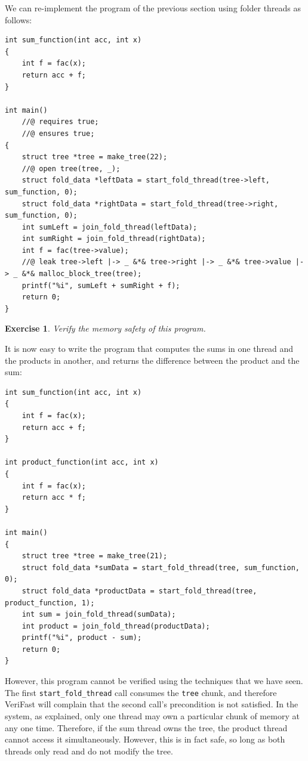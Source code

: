 \documentclass{article}
\newtheorem{exercise}{Exercise}
\begin{document}
We can re-implement the program of the previous section using folder threads as follows:
\begin{lstlisting}
int sum_function(int acc, int x)
{
    int f = fac(x);
    return acc + f;
}

int main()
    //@ requires true;
    //@ ensures true;
{
    struct tree *tree = make_tree(22);
    //@ open tree(tree, _);
    struct fold_data *leftData = start_fold_thread(tree->left, sum_function, 0);
    struct fold_data *rightData = start_fold_thread(tree->right, sum_function, 0);
    int sumLeft = join_fold_thread(leftData);
    int sumRight = join_fold_thread(rightData);
    int f = fac(tree->value);
    //@ leak tree->left |-> _ &*& tree->right |-> _ &*& tree->value |-> _ &*& malloc_block_tree(tree);
    printf("%i", sumLeft + sumRight + f);
    return 0;
}
\end{lstlisting}

\begin{exercise}\label{exercise:fractions0}
Verify the memory safety of this program.
\end{exercise}

It is now easy to write the program that computes the sums in
one thread and the products in another, and returns the
difference between the product and the sum:
\begin{lstlisting}
int sum_function(int acc, int x)
{
    int f = fac(x);
    return acc + f;
}

int product_function(int acc, int x)
{
    int f = fac(x);
    return acc * f;
}

int main()
{
    struct tree *tree = make_tree(21);
    struct fold_data *sumData = start_fold_thread(tree, sum_function, 0);
    struct fold_data *productData = start_fold_thread(tree, product_function, 1);
    int sum = join_fold_thread(sumData);
    int product = join_fold_thread(productData);
    printf("%i", product - sum);
    return 0;
}
\end{lstlisting}

However, this program cannot be verified using the techniques
that we have seen. The first \lstinline!start_fold_!\-\lstinline!thread! call
consumes the \lstinline!tree! chunk, and therefore VeriFast
will complain that the second call's precondition is not
satisfied. In the system, as explained, only one thread may own
a particular chunk of memory at any one time. Therefore, if the
sum thread owns the tree, the product thread cannot access it
simultaneously. However, this is in fact safe, so long as both
threads only read and do not modify the tree.
\end{document}
